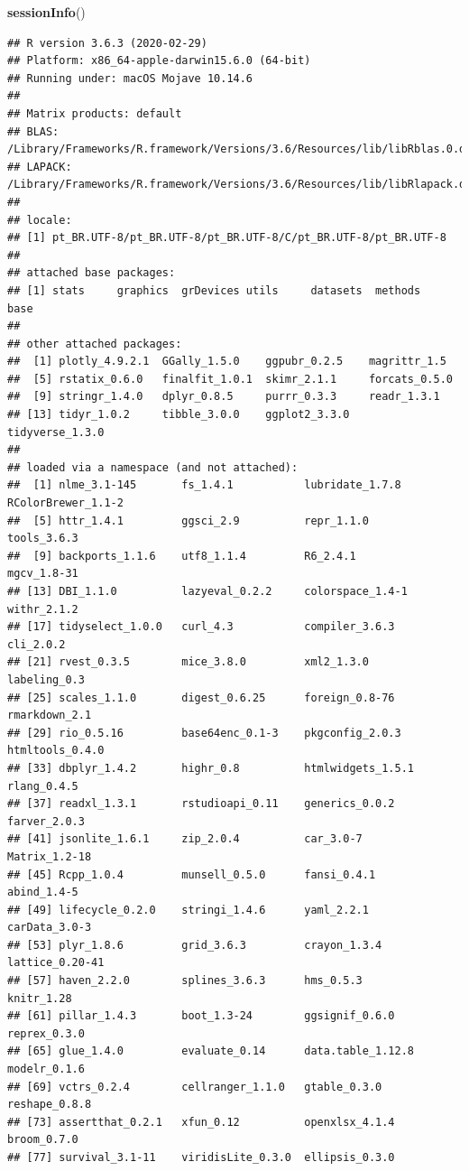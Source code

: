 \documentclass[]{article}
\newenvironment{Shaded}{\begin{snugshade}}{\end{snugshade}}
\newcommand{\KeywordTok}[1]{\textcolor[rgb]{0.13,0.29,0.53}{\textbf{#1}}}
\newcommand{\NormalTok}[1]{#1}
\begin{document}
\begin{Shaded}
\begin{Highlighting}[]
\KeywordTok{sessionInfo}\NormalTok{()}
\end{Highlighting}
\end{Shaded}

\begin{verbatim}
## R version 3.6.3 (2020-02-29)
## Platform: x86_64-apple-darwin15.6.0 (64-bit)
## Running under: macOS Mojave 10.14.6
## 
## Matrix products: default
## BLAS:   /Library/Frameworks/R.framework/Versions/3.6/Resources/lib/libRblas.0.dylib
## LAPACK: /Library/Frameworks/R.framework/Versions/3.6/Resources/lib/libRlapack.dylib
## 
## locale:
## [1] pt_BR.UTF-8/pt_BR.UTF-8/pt_BR.UTF-8/C/pt_BR.UTF-8/pt_BR.UTF-8
## 
## attached base packages:
## [1] stats     graphics  grDevices utils     datasets  methods   base     
## 
## other attached packages:
##  [1] plotly_4.9.2.1  GGally_1.5.0    ggpubr_0.2.5    magrittr_1.5   
##  [5] rstatix_0.6.0   finalfit_1.0.1  skimr_2.1.1     forcats_0.5.0  
##  [9] stringr_1.4.0   dplyr_0.8.5     purrr_0.3.3     readr_1.3.1    
## [13] tidyr_1.0.2     tibble_3.0.0    ggplot2_3.3.0   tidyverse_1.3.0
## 
## loaded via a namespace (and not attached):
##  [1] nlme_3.1-145       fs_1.4.1           lubridate_1.7.8    RColorBrewer_1.1-2
##  [5] httr_1.4.1         ggsci_2.9          repr_1.1.0         tools_3.6.3       
##  [9] backports_1.1.6    utf8_1.1.4         R6_2.4.1           mgcv_1.8-31       
## [13] DBI_1.1.0          lazyeval_0.2.2     colorspace_1.4-1   withr_2.1.2       
## [17] tidyselect_1.0.0   curl_4.3           compiler_3.6.3     cli_2.0.2         
## [21] rvest_0.3.5        mice_3.8.0         xml2_1.3.0         labeling_0.3      
## [25] scales_1.1.0       digest_0.6.25      foreign_0.8-76     rmarkdown_2.1     
## [29] rio_0.5.16         base64enc_0.1-3    pkgconfig_2.0.3    htmltools_0.4.0   
## [33] dbplyr_1.4.2       highr_0.8          htmlwidgets_1.5.1  rlang_0.4.5       
## [37] readxl_1.3.1       rstudioapi_0.11    generics_0.0.2     farver_2.0.3      
## [41] jsonlite_1.6.1     zip_2.0.4          car_3.0-7          Matrix_1.2-18     
## [45] Rcpp_1.0.4         munsell_0.5.0      fansi_0.4.1        abind_1.4-5       
## [49] lifecycle_0.2.0    stringi_1.4.6      yaml_2.2.1         carData_3.0-3     
## [53] plyr_1.8.6         grid_3.6.3         crayon_1.3.4       lattice_0.20-41   
## [57] haven_2.2.0        splines_3.6.3      hms_0.5.3          knitr_1.28        
## [61] pillar_1.4.3       boot_1.3-24        ggsignif_0.6.0     reprex_0.3.0      
## [65] glue_1.4.0         evaluate_0.14      data.table_1.12.8  modelr_0.1.6      
## [69] vctrs_0.2.4        cellranger_1.1.0   gtable_0.3.0       reshape_0.8.8     
## [73] assertthat_0.2.1   xfun_0.12          openxlsx_4.1.4     broom_0.7.0       
## [77] survival_3.1-11    viridisLite_0.3.0  ellipsis_0.3.0
\end{verbatim}
\end{document}
